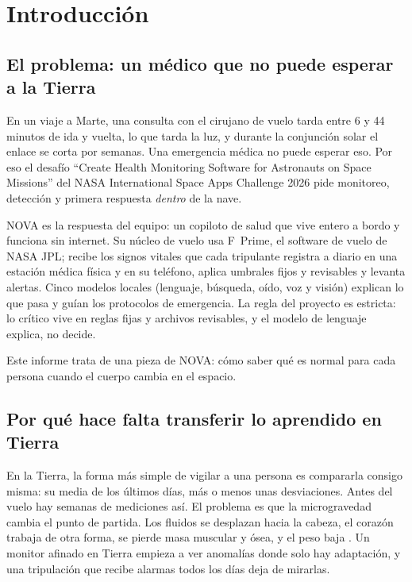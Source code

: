 \chapter{Introducción}\label{cap:intro}

\section{El problema: un médico que no puede esperar a la Tierra}

En un viaje a Marte, una consulta con el cirujano de vuelo tarda entre 6 y 44 minutos de ida y vuelta, lo que tarda la
luz, y durante la conjunción solar el enlace se corta por semanas. Una emergencia médica no puede esperar eso. Por eso
el desafío \enquote{Create Health Monitoring Software for Astronauts on Space Missions} del NASA International Space
Apps Challenge 2026 pide monitoreo, detección y primera respuesta \emph{dentro} de la nave.

NOVA es la respuesta del equipo: un copiloto de salud que vive entero a bordo y funciona sin internet. Su núcleo de
vuelo usa F~Prime, el software de vuelo de NASA JPL; recibe los signos vitales que cada tripulante registra a diario en
una estación médica física y en su teléfono, aplica umbrales fijos y revisables y levanta alertas. Cinco modelos
locales (lenguaje, búsqueda, oído, voz y visión) explican lo que pasa y guían los protocolos de emergencia. La regla
del proyecto es estricta: lo crítico vive en reglas fijas y archivos revisables, y el modelo de lenguaje explica, no
decide.

Este informe trata de una pieza de NOVA: cómo saber qué es normal para cada persona cuando el cuerpo cambia en el
espacio.

\section{Por qué hace falta transferir lo aprendido en Tierra}

En la Tierra, la forma más simple de vigilar a una persona es compararla consigo misma: su media de los últimos días,
más o menos unas desviaciones. Antes del vuelo hay semanas de mediciones así. El problema es que la microgravedad
cambia el punto de partida. Los fluidos se desplazan hacia la cabeza, el corazón trabaja de otra forma, se pierde
masa muscular y ósea, y el peso baja \parencite{norsk2020,hughson2018,pavy2007}. Un monitor afinado en Tierra empieza
a ver anomalías donde solo hay adaptación, y una tripulación que recibe alarmas todos los días deja de mirarlas.

